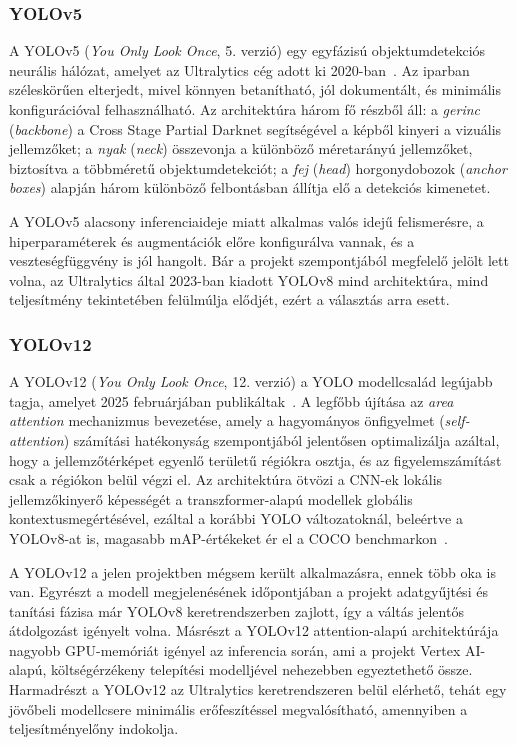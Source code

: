         \subsubsection{YOLOv5}

        A YOLOv5 (\textit{You Only Look Once}, 5. verzió) egy egyfázisú objektumdetekciós neurális hálózat, amelyet az Ultralytics
        cég adott ki 2020-ban~\cite{yolov5}. Az iparban széleskörűen elterjedt, mivel könnyen betanítható, jól dokumentált, és
        minimális konfigurációval felhasználható. Az architektúra három fő részből áll: a \textit{gerinc} (\textit{backbone}) a
        Cross Stage Partial Darknet segítségével a képből kinyeri a vizuális jellemzőket; a \textit{nyak} (\textit{neck}) összevonja
        a különböző méretarányú jellemzőket, biztosítva a többméretű objektumdetekciót; a \textit{fej} (\textit{head}) horgonydobozok
        (\textit{anchor boxes}) alapján három különböző felbontásban állítja elő a detekciós kimenetet.

        A YOLOv5 alacsony inferenciaideje miatt alkalmas valós idejű felismerésre, a hiperparaméterek és augmentációk előre
        konfigurálva vannak, és a veszteségfüggvény is jól hangolt. Bár a projekt szempontjából megfelelő jelölt lett volna,
        az Ultralytics által 2023-ban kiadott YOLOv8 mind architektúra, mind teljesítmény tekintetében felülmúlja elődjét,
        ezért a választás arra esett.

        \subsubsection{YOLOv12}

        A YOLOv12 (\textit{You Only Look Once}, 12. verzió) a YOLO modellcsalád legújabb tagja, amelyet 2025 februárjában
        publikáltak~\cite{yolov12}. A legfőbb újítása az \textit{area attention} mechanizmus bevezetése, amely a hagyományos
        önfigyelmet (\textit{self-attention}) számítási hatékonyság szempontjából jelentősen optimalizálja azáltal, hogy a
        jellemzőtérképet egyenlő területű régiókra osztja, és az figyelemszámítást csak a régiókon belül végzi el. Az
        architektúra ötvözi a CNN-ek lokális jellemzőkinyerő képességét a transzformer-alapú modellek globális kontextusmegértésével,
        ezáltal a korábbi YOLO változatoknál, beleértve a YOLOv8-at is, magasabb mAP-értékeket ér el a COCO
        benchmarkon~\cite{yolov12}.

        A YOLOv12 a jelen projektben mégsem került alkalmazásra, ennek több oka is van. Egyrészt a modell megjelenésének
        időpontjában a projekt adatgyűjtési és tanítási fázisa már YOLOv8 keretrendszerben zajlott, így a váltás
        jelentős átdolgozást igényelt volna. Másrészt a YOLOv12 attention-alapú architektúrája nagyobb GPU-memóriát igényel
        az inferencia során, ami a projekt Vertex AI-alapú, költségérzékeny telepítési modelljével nehezebben egyeztethető
        össze. Harmadrészt a YOLOv12 az Ultralytics keretrendszeren belül elérhető, tehát egy jövőbeli modellcsere
        minimális erőfeszítéssel megvalósítható, amennyiben a teljesítményelőny indokolja.

